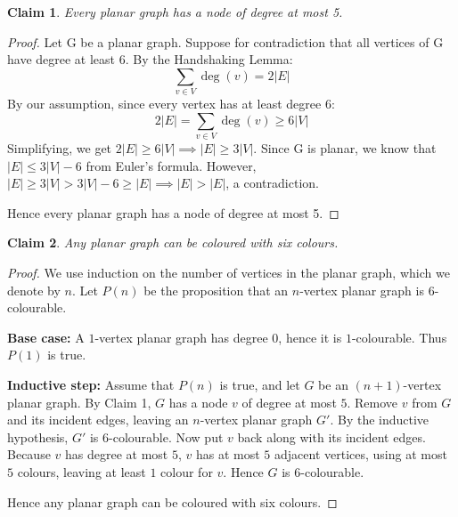 \documentclass{article}
\newtheorem{claim}{Claim}
\begin{document}
\begin{claim}
    Every planar graph has a node of degree at most 5.
\end{claim}

\begin{proof}
    Let G be a planar graph. Suppose for contradiction that all vertices of G 
    have degree at least 6. By the Handshaking Lemma:
    \[
    \sum_{v \in V} \deg(v) = 2|E|
    \]
    By our assumption, since every vertex has at least degree 6:
    \[
    2|E| = \sum_{v \in V} \deg(v) \geq 6|V|
    \]
    Simplifying, we get $2|E| \geq 6|V| \implies |E| \geq 3|V|$. Since G is planar, 
    we know that $|E| \leq 3|V| - 6$ from Euler's formula. However, $|E| \geq 3|V| 
    > 3|V| - 6 \geq |E| \implies |E| > |E|$, a contradiction.
    
    \medskip

    Hence every planar graph has a node of degree at most 5.
\end{proof}

\begin{claim}
    Any planar graph can be coloured with six colours.
\end{claim}

\begin{proof}
    We use induction on the number of vertices in the planar graph, which we denote 
    by $n$. Let $P(n)$ be the proposition that an $n$-vertex planar graph is 
    $6$-colourable.

    \medskip
    \textbf{Base case:}
    A $1$-vertex planar graph has degree $0$, hence it is $1$-colourable. Thus $P(1)$ 
    is true.

    \medskip
    \textbf{Inductive step:}
    Assume that $P(n)$ is true, and let $G$ be an $(n+1)$-vertex planar graph. By 
    Claim 1, $G$ has a node $v$ of degree at most $5$. Remove $v$ from $G$ and its
    incident edges, leaving an $n$-vertex planar graph $G'$. By the inductive 
    hypothesis, $G'$ is $6$-colourable. Now put $v$ back along with its incident 
    edges. Because $v$ has degree at most $5$, $v$ has at most $5$ adjacent vertices, 
    using at most $5$ colours, leaving at least $1$ colour for $v$. Hence $G$ is 
    $6$-colourable.

    \medskip

    Hence any planar graph can be coloured with six colours.
\end{proof}
\end{document}
